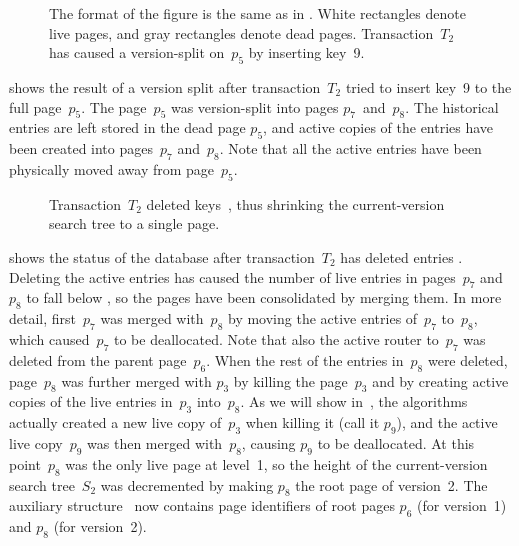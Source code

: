 \begin{figure}[!htb]
\begin{center}
  
  {
  The format of the figure is the same as in .
  White rectangles denote live pages, and gray rectangles denote dead pages.
  Transaction~$T_2$ has caused a version-split on~$p_5$ by inserting
  key~\num{9}.}
  \label{fig:example-oper-2}
\end{center}
\end{figure}

 shows the result of a version split
after transaction~$T_2$ tried to insert key~\num{9} to the full page~$p_5$. 
The page~$p_5$ was version-split into pages $p_7$~and~$p_8$.  
The historical entries are left stored in the dead page $p_5$, and active
copies of the entries have been created into pages~$p_7$ and~$p_8$.
Note that all the active entries have been physically moved away from
page~$p_5$.

\begin{figure}[!htb]
\begin{center}
  
  {Transaction~$T_2$ deleted keys~, thus shrinking
  the current-version search tree to a single page.}
  \label{fig:example-oper-3}
\end{center}
\end{figure}

 shows the status of the database after
transaction~$T_2$ has deleted entries . 
Deleting the active entries has caused the number of live entries in
pages~$p_7$ and~$p_8$ to fall below \minlive, so the pages have been
consolidated by merging them.
In more detail, first~$p_7$ was merged with~$p_8$ by moving the active
entries of~$p_7$ to~$p_8$, which caused~$p_7$ to be deallocated. 
Note that also the active router to~$p_7$ was deleted from the parent
page~$p_6$. 
When the rest of the entries in~$p_8$ were deleted, page~$p_8$ was further
merged with $p_3$ by killing the page~$p_3$ and by creating active copies of
the live entries in~$p_3$ into~$p_8$. 
As we will show in~, the algorithms actually created
a new live copy of~$p_3$ when killing it (call it $p_9$), and the active live
copy~$p_9$ was then merged with~$p_8$, causing $p_9$ to be deallocated.
At this point~$p_8$ was the only live page at level~\num{1}, so the height of
the current-version search tree~$S_2$ was decremented by making
$p_8$ the root page of version~\num{2}. 
The auxiliary structure \rootstar\ now contains page identifiers of root
pages $p_6$ (for version~\num{1}) and $p_8$ (for version~\num{2}).

